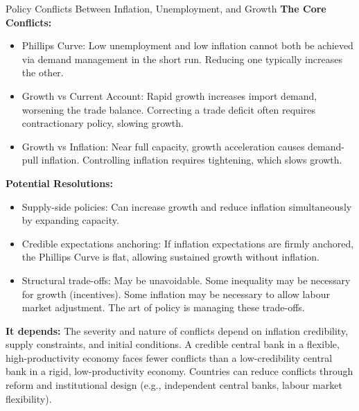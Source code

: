 \documentclass[11pt, a4paper, twoside]{book}
\begin{document}
\begin{evaluation}{Policy Conflicts Between Inflation, Unemployment, and Growth}
\textbf{The Core Conflicts:}
\begin{itemize}
  \item Phillips Curve: Low unemployment and low inflation cannot both be achieved via demand management in the short run. Reducing one typically increases the other.
  \item Growth vs Current Account: Rapid growth increases import demand, worsening the trade balance. Correcting a trade deficit often requires contractionary policy, slowing growth.
  \item Growth vs Inflation: Near full capacity, growth acceleration causes demand-pull inflation. Controlling inflation requires tightening, which slows growth.
\end{itemize}

\textbf{Potential Resolutions:}
\begin{itemize}
  \item Supply-side policies: Can increase growth and reduce inflation simultaneously by expanding capacity.
  \item Credible expectations anchoring: If inflation expectations are firmly anchored, the Phillips Curve is flat, allowing sustained growth without inflation.
  \item Structural trade-offs: May be unavoidable. Some inequality may be necessary for growth (incentives). Some inflation may be necessary to allow labour market adjustment. The art of policy is managing these trade-offs.
\end{itemize}

\textbf{It depends:}
The severity and nature of conflicts depend on inflation credibility, supply constraints, and initial conditions. A credible central bank in a flexible, high-productivity economy faces fewer conflicts than a low-credibility central bank in a rigid, low-productivity economy. Countries can reduce conflicts through reform and institutional design (e.g., independent central banks, labour market flexibility).
\end{evaluation}
\end{document}
